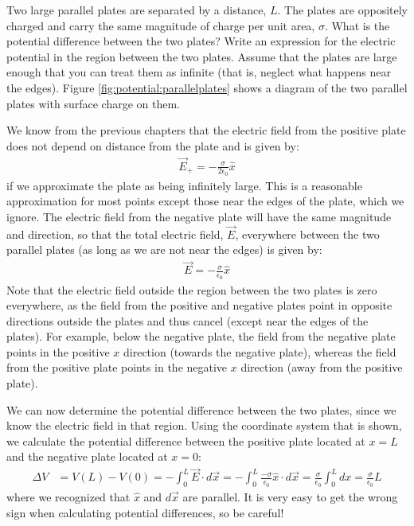 \begin{example}{\label{ex:potential:parallelplates}Two large parallel plates are separated by a distance, $L$. The plates are oppositely charged and carry the same magnitude of charge per unit area, $\sigma$. What is the potential difference between the two plates? Write an expression for the electric potential in the region between the two plates. Assume that the plates are large enough that you can treat them as infinite (that is, neglect what happens near the edges).}
Figure \ref{fig:potential:parallelplates} shows a diagram of the two parallel plates with surface charge on them. 

We know from the previous chapters that the electric field from the positive plate does not depend on distance from the plate and is given by:
\begin{align*}
\vec E_+=-\frac{\sigma}{2\epsilon_0} \hat x
\end{align*}
if we approximate the plate as being infinitely large. This is a reasonable approximation for most points except those near the edges of the plate, which we ignore. The electric field from the negative plate will have the same magnitude and direction, so that the total electric field, $\vec E$, everywhere between the two parallel plates (as long as we are not near the edges) is given by:
\begin{align*}
\vec E=-\frac{\sigma}{\epsilon_0} \hat x
\end{align*}
Note that the electric field outside the region between the two plates is zero everywhere, as the field from the positive and negative plates point in opposite directions outside the plates and thus cancel (except near the edges of the plates). For example, below the negative plate, the field from the negative plate points in the positive $x$ direction (towards the negative plate), whereas the field from the positive plate points in the negative $x$ direction (away from the positive plate).

We can now determine the potential difference between the two plates, since we know the electric field in that region. Using the coordinate system that is shown, we calculate the potential difference between the positive plate located at $x=L$ and the negative plate located at $x=0$:
\begin{align*}
\Delta V &=V(L)-V(0)=- \int_0^L  \vec E\cdot d\vec x=-\int_0^L\frac{-\sigma}{\epsilon_0} \hat x \cdot d\vec x=\frac{\sigma}{\epsilon_0}\int_0^L dx=\frac{\sigma}{\epsilon_0}L
\end{align*}
where we recognized that $\hat x$ and $d\vec x$ are parallel. It is very easy to get the wrong sign when calculating potential differences, so be careful!


\end{example}
